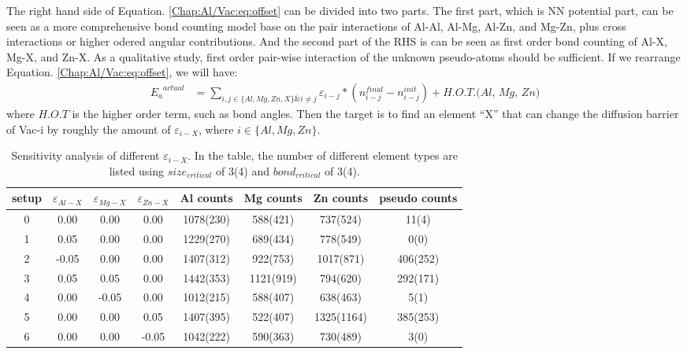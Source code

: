 The right hand side of Equation. \ref{Chap:Al/Vac:eq:offset} can be divided into two parts. The first part, which is \ac{NN} potential part, can be seen as a more comprehensive bond counting model \cite{soisson1996monte} base on the pair interactions of Al-Al, Al-Mg, Al-Zn, and Mg-Zn, plus cross interactions or higher odered angular contributions. And the second part of the RHS is can be seen as first order bond counting of Al-X, Mg-X, and Zn-X. As a qualitative study, first order pair-wise interaction of the unknown pseudo-atoms should be sufficient. If we rearrange Equation. \ref{Chap:Al/Vac:eq:offset}, we will have:
\begin{subequations}
\begin{align}
{E_a}^{actual} & = \sum_{i, j \in\{Al, Mg, Zn, X\} \& i \neq j} \varepsilon_{i-j} * ( n_{i-j}^{final} - n_{i-j}^{init}) + \textit{H.O.T.(Al, Mg, Zn)} \label{Chap:Al/Vac:eq:rearrange}
\end{align}
\end{subequations}
where $H.O.T$ is the higher order term, such as bond angles. Then the target is to find an element ``X'' that can change the diffusion barrier of Vac-i by roughly the amount of $\varepsilon_{i-X}$, where $i \in \{Al, Mg, Zn\}$.


\begin{table}[!htbp]
\centering
\caption[Sensitivity analysis of different $\varepsilon_{i-X}$.]{Sensitivity analysis of different $\varepsilon_{i-X}$. In the table, the number of different element types are listed using $size_{critical}$ of 3(4) and $bond_{critical}$ of 3(4).}
\label{Chap:Al/Vac:tab:pseudo1}
\begin{tabular}{cccccccc}
\\
\hline
\hline
setup & $\varepsilon_{Al-X}$  & $\varepsilon_{Mg-X}$  & $\varepsilon_{Zn-X}$ & Al counts & Mg counts & Zn counts & pseudo counts\\
\hline
0 &  0.00    &  0.00       &  0.00 & 1078(230) & 588(421)  &  737(524)  & 11(4)                \\
1 &  0.05    &  0.00       &  0.00 & 1229(270) &  689(434) &   778(549) & 0(0)                \\
2 & -0.05    &  0.00       &  0.00 & 1407(312) & 922(753)  & 1017(871)  & 406(252)                \\
3 &  0.05    &  0.05       &  0.00 & 1442(353) & 1121(919) & 794(620)   & 292(171)                \\
4 &  0.00    & -0.05       &  0.00 & 1012(215) &  588(407) &  638(463)  & 5(1)                \\
5 &  0.00    &  0.00       &  0.05 & 1407(395) & 522(407)  & 1325(1164) & 385(253)                \\
6 &  0.00    &  0.00       & -0.05 & 1042(222) &  590(363) &  730(489)  & 3(0)                \\

\hline
\hline
\end{tabular}
\end{table}


